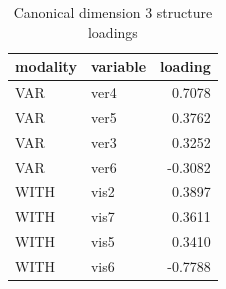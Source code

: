 \begin{table}
\caption{Canonical dimension 3 structure loadings}
\label{tab:cca_dimension_3_loadings}
\begin{tabular}{llr}
\toprule
modality & variable & loading \\
\midrule
VAR & ver4 & 0.7078 \\
VAR & ver5 & 0.3762 \\
VAR & ver3 & 0.3252 \\
VAR & ver6 & -0.3082 \\
WITH & vis2 & 0.3897 \\
WITH & vis7 & 0.3611 \\
WITH & vis5 & 0.3410 \\
WITH & vis6 & -0.7788 \\
\bottomrule
\end{tabular}
\end{table}
